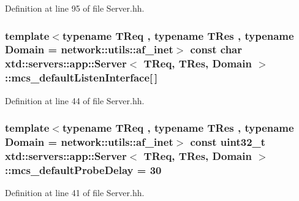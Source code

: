 Definition at line 95 of file Server.\+hh.

\subsubsection[{\texorpdfstring{mcs\+\_\+default\+Listen\+Interface}{mcs_defaultListenInterface}}]{\setlength{\rightskip}{0pt plus 5cm}template$<$typename T\+Req , typename T\+Res , typename Domain  = network\+::utils\+::af\+\_\+inet$>$ const char {\bf xtd\+::servers\+::app\+::\+Server}$<$ T\+Req, T\+Res, Domain $>$\+::mcs\+\_\+default\+Listen\+Interface\mbox{[}$\,$\mbox{]}\hspace{0.3cm}{\ttfamily [static]}}\hypertarget{classxtd_1_1servers_1_1app_1_1Server_a9d3ac8218bf47d8ffa6d8b30a6195fa8}{}\label{classxtd_1_1servers_1_1app_1_1Server_a9d3ac8218bf47d8ffa6d8b30a6195fa8}


Definition at line 44 of file Server.\+hh.

\subsubsection[{\texorpdfstring{mcs\+\_\+default\+Probe\+Delay}{mcs_defaultProbeDelay}}]{\setlength{\rightskip}{0pt plus 5cm}template$<$typename T\+Req , typename T\+Res , typename Domain  = network\+::utils\+::af\+\_\+inet$>$ const uint32\+\_\+t {\bf xtd\+::servers\+::app\+::\+Server}$<$ T\+Req, T\+Res, Domain $>$\+::mcs\+\_\+default\+Probe\+Delay = 30\hspace{0.3cm}{\ttfamily [static]}}\hypertarget{classxtd_1_1servers_1_1app_1_1Server_ae361d389bf6050e2565055e7e3800e82}{}\label{classxtd_1_1servers_1_1app_1_1Server_ae361d389bf6050e2565055e7e3800e82}


Definition at line 41 of file Server.\+hh.

